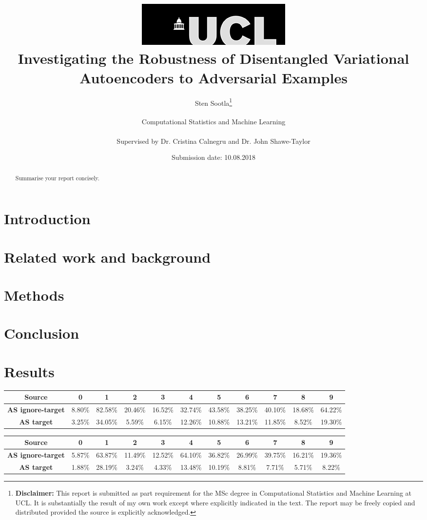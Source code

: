 \documentclass{report}
\title{  	{ \includegraphics[scale=.5,natwidth=294,natheight=84]{ucl_logo.png}}\\
{{\Huge Investigating the Robustness of Disentangled Variational Autoencoders to Adversarial Examples}}\\}
\date{Submission date: 10.08.2018}
\author{Sten Sootla\thanks{
{\bf Disclaimer:}
This report is submitted as part requirement for the MSc degree in Computational Statistics and Machine Learning at UCL. It is substantially the result of my own work except where explicitly indicated in the text. The report may be freely copied and distributed provided the source is explicitly acknowledged.}
\\ \\
Computational Statistics and Machine Learning\\ \\
Supervised by Dr. Cristina Calnegru and Dr. John Shawe-Taylor
}
\begin{document}
 
\onehalfspacing
\maketitle
\begin{abstract}
Summarise your report concisely.
\end{abstract}
\tableofcontents
\setcounter{page}{1}


\chapter{Introduction}

\chapter{Related work and background}

\chapter{Methods}

\chapter{Conclusion}
\chapter{Results}

\begin{center}
{\tiny
  \begin{tabular}{|c|c|c|c|c|c|c|c|c|c|c|}
  \hline
  \textbf{Source} & \textbf{0} & \textbf{1} & \textbf{2} & \textbf{3} & \textbf{4} & \textbf{5} & \textbf{6} & \textbf{7} & \textbf{8} & \textbf{9}  \\ \hline
  \textbf{AS ignore-target} & 8.80\% & 82.58\% & 20.46\% & 16.52\% & 32.74\% & 43.58\% & 38.25\% & 40.10\% & 18.68\% & 64.22\% \\ \hline
  \textbf{AS target} & 3.25\% & 34.05\% & 5.59\% & 6.15\% & 12.26\% & 10.88\% & 13.21\% & 11.85\% & 8.52\% & 19.30\% \\ \hline
  \end{tabular}
}
\end{center}

\begin{center}
{\tiny
  \begin{tabular}{|c|c|c|c|c|c|c|c|c|c|c|}
  \hline
  \textbf{Source} & \textbf{0} & \textbf{1} & \textbf{2} & \textbf{3} & \textbf{4} & \textbf{5} & \textbf{6} & \textbf{7} & \textbf{8} & \textbf{9}  \\ \hline
  \textbf{AS ignore-target} & 5.87\% & 63.87\% & 11.49\% & 12.52\% & 64.10\% & 36.82\% & 26.99\% & 39.75\% & 16.21\% & 19.36\% \\ \hline
  \textbf{AS target} & 1.88\% & 28.19\% & 3.24\% & 4.33\% & 13.48\% & 10.19\% & 8.81\% & 7.71\% & 5.71\% & 8.22\% \\ \hline
  \end{tabular}
}
\end{center}
\end{document}
